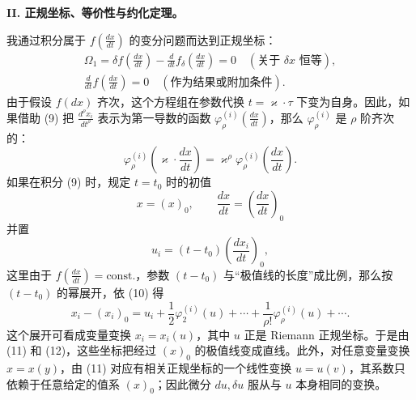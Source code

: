 \begin{center}
\textbf{II. 正规坐标、等价性与约化定理。}
\end{center}

我通过积分属于 \(f\!\left(\frac{dx}{dt}\right)\) 的变分问题而达到正规坐标：
\begin{equation}
\begin{gathered}
\Omega_1=\delta f\!\left(\frac{dx}{dt}\right)
-\frac{d}{dt}f_\delta\!\left(\frac{dx}{dt}\right)=0
\quad(\text{关于 }\delta x\text{ 恒等}),\\
\frac{d}{dt}f\!\left(\frac{dx}{dt}\right)=0
\quad(\text{作为结果或附加条件}).
\end{gathered}
\tag{9}
\end{equation}
由于假设 \(f(dx)\) 齐次，这个方程组在参数代换 \(t=\varkappa\cdot\tau\) 下变为自身。因此，如果借助 (9) 把
\(\frac{d^\rho x_i}{dt^\rho}\) 表示为第一导数的函数
\(\varphi_\rho^{(i)}\!\left(\frac{dx}{dt}\right)\)，那么 \(\varphi_\rho^{(i)}\) 是 \(\rho\) 阶齐次的：
\begin{equation}
\varphi_\rho^{(i)}\!\left(\varkappa\cdot\frac{dx}{dt}\right)
=\varkappa^\rho\varphi_\rho^{(i)}\!\left(\frac{dx}{dt}\right).
\tag{10}
\end{equation}
如果在积分 (9) 时，规定 \(t=t_0\) 时的初值
\[
x=(x)_0,\qquad \frac{dx}{dt}=\left(\frac{dx}{dt}\right)_0
\]
并置
\begin{equation}
u_i=(t-t_0)\left(\frac{dx_i}{dt}\right)_0,
\tag{11}
\end{equation}
这里由于 \(f\!\left(\frac{dx}{dt}\right)=\mathrm{const.}\)，参数
\((t-t_0)\) 与“极值线的长度”成比例，那么按 \((t-t_0)\) 的幂展开，依 (10) 得
\begin{equation}
x_i-(x_i)_0=u_i+\frac12\varphi_2^{(i)}(u)+\cdots+
\frac{1}{\rho!}\varphi_\rho^{(i)}(u)+\cdots .
\tag{12}
\end{equation}
这个展开可看成变量变换 \(x_i=x_i(u)\)，其中 \(u\) 正是 Riemann 正规坐标。于是由 (11) 和 (12)，这些坐标把经过 \((x)_0\) 的极值线变成直线。此外，对任意变量变换 \(x=x(y)\)，由 (11) 对应有相关正规坐标的一个线性变换 \(u=u(v)\)，其系数只依赖于任意给定的值系 \((x)_0\)；因此微分 \(du,\delta u\) 服从与 \(u\) 本身相同的变换。

